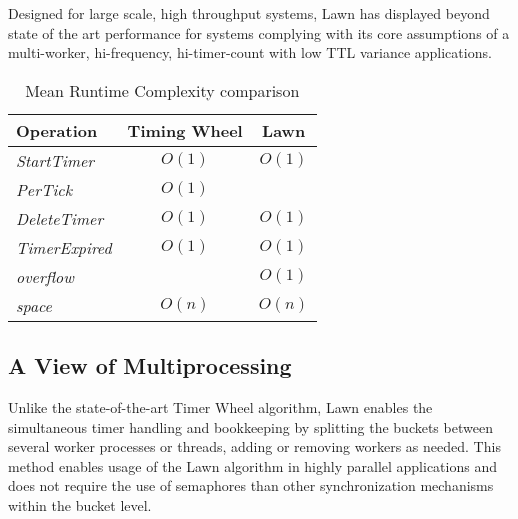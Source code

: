 \documentclass[conference]{IEEEtran}
\begin{document}
Designed for large scale, high throughput systems, Lawn has displayed beyond state of the art performance for systems complying with its core assumptions of a multi-worker, hi-frequency, hi-timer-count with low TTL variance applications.

\begin{table}[ht]
	\begin{center}
		\begin{tabular}{l|c|c}
			\textbf{Operation} & \textbf{Timing Wheel} & \textbf{Lawn} \\
			\hline
			\textit{StartTimer} & $O(1)$ & $O(1)$ \\
			\textit{PerTick} & $O(1)$ & \boldmath{$O(t\sim1)$} \\
			\textit{DeleteTimer} & $O(1)$ & $O(1)$ \\
			\textit{TimerExpired} & $O(1)$ & $O(1)$ \\
			\textit{overflow} & \boldmath{$O(n)$} & $O(1)$ \\
			\textit{space} & $O(n)$ & $O(n)$ \\
		\end{tabular}
		\linebreak
		\caption{Mean Runtime Complexity comparison}
	\end{center}
\end{table}

\subsection{A View of Multiprocessing} 
Unlike the state-of-the-art Timer Wheel algorithm, Lawn enables the simultaneous timer handling and bookkeeping by splitting the buckets between several worker processes or threads, adding or removing workers as needed. This method enables usage of the Lawn algorithm in highly parallel applications and does not require the use of semaphores than other synchronization mechanisms within the bucket level.
\end{document}
